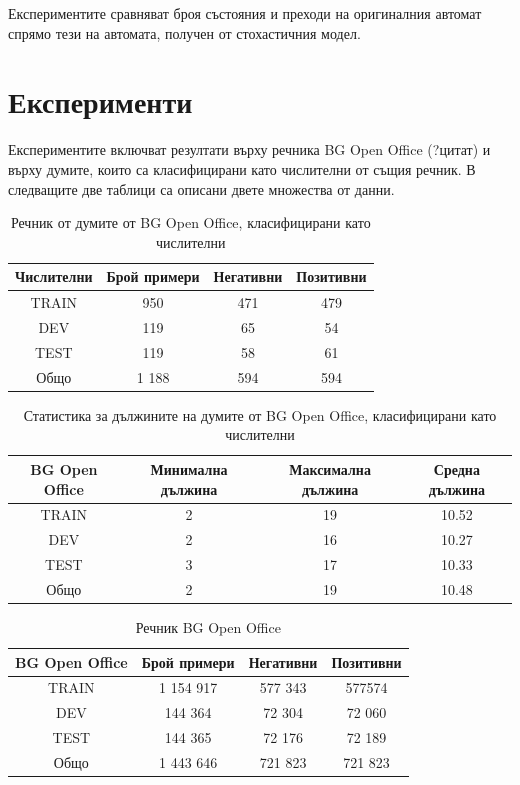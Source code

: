 \documentclass[a4paper,12pt]{article}
\begin{document}
Експериментите сравняват броя състояния и преходи на оригиналния автомат спрямо тези на автомата, получен от стохастичния модел. 

\pagebreak

\section{Експерименти}

Експериментите включват резултати върху речника BG Open Office (?цитат) и върху думите, които са класифицирани като числителни от същия речник. В следващите две таблици са описани двете множества от данни. 

\begin{table}[h!]
\centering
\begin{tabular}{|c|c|c|c|}
\hline
Числителни & Брой примери & Негативни & Позитивни\\
\hline
TRAIN & 950 & 471 & 479\\
\hline
DEV & 119 & 65 & 54\\
\hline
TEST & 119 & 58 & 61\\
\hline
Общо & 1 188 & 594 & 594\\
\hline
\end{tabular}
\caption{Речник от думите от BG Open Office, класифицирани като числителни}
\label{table:1}
\end{table}

\begin{table}[h!]
\centering
\begin{tabular}{|c|c|c|c|}
\hline
BG Open Office & Минимална дължина & Максимална дължина & Средна дължина\\
\hline
TRAIN & 2 & 19 & 10.52\\
\hline
DEV & 2 & 16 & 10.27\\
\hline
TEST & 3 & 17 & 10.33\\
\hline
Общо & 2 & 19 & 10.48\\
\hline
\end{tabular}
\caption{Статистика за дължините на думите от BG Open Office, класифицирани като числителни}
\label{table:2}
\end{table}

\begin{table}[h!]
\centering
\begin{tabular}{|c|c|c|c|}
\hline
BG Open Office & Брой примери & Негативни & Позитивни\\
\hline
TRAIN & 1 154 917 & 577 343 & 577574\\
\hline
DEV & 144 364 & 72 304 & 72 060\\
\hline
TEST & 144 365 & 72 176 & 72 189\\
\hline
Общо & 1 443 646 & 721 823 & 721 823\\
\hline
\end{tabular}
\caption{Речник BG Open Office}
\label{table:3}
\end{table}
\end{document}
